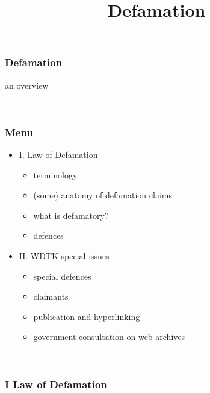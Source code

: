 \documentclass[ignorenonframetext,]{beamer}
\title{Defamation}
\date{}
\begin{document}
\frame{\titlepage}

\begin{frame}
\frametitle{{Defamation}}

{an overview}

~


\end{frame}

\begin{frame}
\frametitle{Menu}

\begin{itemize}
\item  I. Law of Defamation

  \begin{itemize}
  \item    terminology
  \item    (some) anatomy of defamation claims
  \item    what is defamatory?
  \item    defences
  \end{itemize}
\item  II. WDTK special issues

  \begin{itemize}
  \item    special defences
  \item    claimants
  \item    publication and hyperlinking
  \item    government consultation on web archives
  \end{itemize}
\end{itemize}

~


\end{frame}

\begin{frame}
\frametitle{{I Law of Defamation}}
\end{frame}
\end{document}
